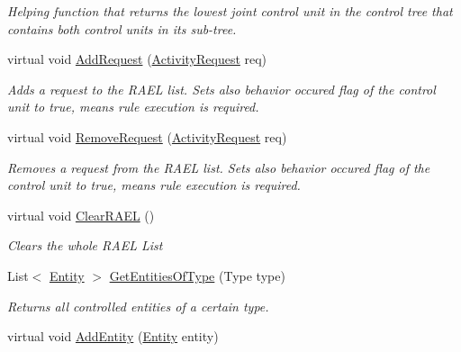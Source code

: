 \begin{DoxyCompactItemize}
\begin{DoxyCompactList}\small\item\em Helping function that returns the lowest joint control unit in the control tree that contains both control units in its sub-\/tree. \end{DoxyCompactList}\item 
virtual void \hyperlink{class_simulation_core_1_1_h_c_c_m_elements_1_1_control_unit_a5c82aae599d8a087bda51c7bce209121}{Add\+Request} (\hyperlink{class_simulation_core_1_1_h_c_c_m_elements_1_1_activity_request}{Activity\+Request} req)
\begin{DoxyCompactList}\small\item\em Adds a request to the R\+A\+EL list. Sets also behavior occured flag of the control unit to true, means rule execution is required. \end{DoxyCompactList}\item 
virtual void \hyperlink{class_simulation_core_1_1_h_c_c_m_elements_1_1_control_unit_aa00209cd318f2fb3bec54fe764d97652}{Remove\+Request} (\hyperlink{class_simulation_core_1_1_h_c_c_m_elements_1_1_activity_request}{Activity\+Request} req)
\begin{DoxyCompactList}\small\item\em Removes a request from the R\+A\+EL list. Sets also behavior occured flag of the control unit to true, means rule execution is required. \end{DoxyCompactList}\item 
virtual void \hyperlink{class_simulation_core_1_1_h_c_c_m_elements_1_1_control_unit_a15f40a53c6c5246561ea19392489e1f5}{Clear\+R\+A\+EL} ()
\begin{DoxyCompactList}\small\item\em Clears the whole R\+A\+EL List \end{DoxyCompactList}\item 
List$<$ \hyperlink{class_simulation_core_1_1_h_c_c_m_elements_1_1_entity}{Entity} $>$ \hyperlink{class_simulation_core_1_1_h_c_c_m_elements_1_1_control_unit_a54be25f73142c741a0feaf68580a0c7a}{Get\+Entities\+Of\+Type} (Type type)
\begin{DoxyCompactList}\small\item\em Returns all controlled entities of a certain type. \end{DoxyCompactList}\item 
virtual void \hyperlink{class_simulation_core_1_1_h_c_c_m_elements_1_1_control_unit_a3a975f2b69a042ac14141f2b011d0167}{Add\+Entity} (\hyperlink{class_simulation_core_1_1_h_c_c_m_elements_1_1_entity}{Entity} entity)

\end{DoxyCompactItemize}

